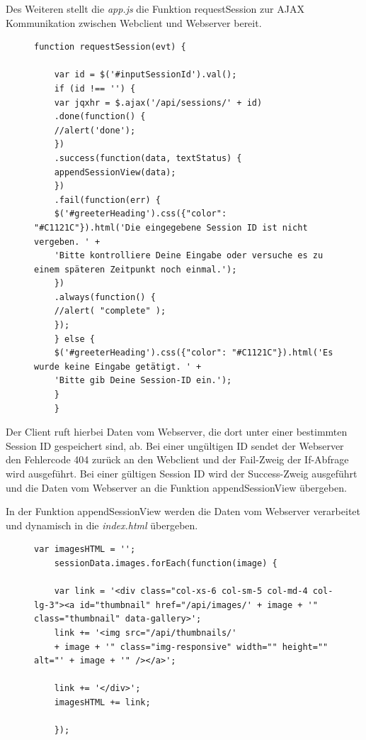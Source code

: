 Des Weiteren stellt die \textit{app.js} die Funktion requestSession zur AJAX Kommunikation zwischen Webclient und Webserver bereit.

\begin{figure}[h]
	\begin{lstlisting}[caption={Auszug aus app.js}, label=list_client]
	function requestSession(evt) {
	
	var id = $('#inputSessionId').val();
	if (id !== '') {
	var jqxhr = $.ajax('/api/sessions/' + id)
	.done(function() {
	//alert('done');
	})
	.success(function(data, textStatus) {
	appendSessionView(data);
	})
	.fail(function(err) {
	$('#greeterHeading').css({"color": "#C1121C"}).html('Die eingegebene Session ID ist nicht vergeben. ' +
	'Bitte kontrolliere Deine Eingabe oder versuche es zu einem späteren Zeitpunkt noch einmal.');
	})
	.always(function() {
	//alert( "complete" );
	});
	} else {
	$('#greeterHeading').css({"color": "#C1121C"}).html('Es wurde keine Eingabe getätigt. ' +
	'Bitte gib Deine Session-ID ein.');
	}
	}
	\end{lstlisting}
\end{figure}

Der Client ruft hierbei Daten vom Webserver, die dort unter einer bestimmten Session ID gespeichert sind, ab. Bei einer ungültigen ID sendet der Webserver den Fehlercode 404 zurück an den Webclient und der Fail-Zweig der If-Abfrage wird ausgeführt. Bei einer gültigen Session ID wird der Success-Zweig ausgeführt und die Daten vom Webserver an die Funktion appendSessionView übergeben.

In der Funktion appendSessionView werden die Daten vom Webserver verarbeitet und dynamisch in die \textit{index.html} übergeben.

\begin{figure}[h]
	\begin{lstlisting}[caption={Auszug aus app.js}, label=list_client]
	var imagesHTML = '';
	sessionData.images.forEach(function(image) {
	
	var link = '<div class="col-xs-6 col-sm-5 col-md-4 col-lg-3"><a id="thumbnail" href="/api/images/' + image + '" class="thumbnail" data-gallery>';
	link += '<img src="/api/thumbnails/'
	+ image + '" class="img-responsive" width="" height="" alt="' + image + '" /></a>';
	
	link += '</div>';
	imagesHTML += link;
	
	});
	\end{lstlisting}
\end{figure}

